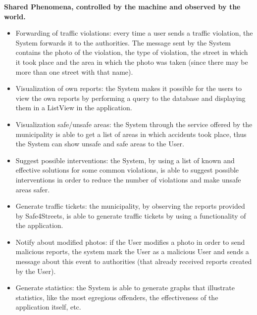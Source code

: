     \noindent\textbf{Shared Phenomena, controlled by the machine and observed by the world.}
      \begin{itemize}
          \item Forwarding of traffic violations: every time a user sends a traffic violation, the System forwards it to the authorities. The message sent by the System contains the photo of the violation, the type of violation, the street in which it took place and the area in which the photo was taken (since there may be more than one street with that name).
          \item Visualization of own reports: the System makes it possible for the users to view the own reports by performing a query to the database and displaying them in a ListView in the application.
          \item Visualization safe/unsafe areas: the System through the service offered by the municipality is able to get a list of areas in which accidents took place, thus the System can show unsafe and safe areas to the User.
          \item Suggest possible interventions: the System,  by using a list of known and effective solutions for some common violations, is able to suggest possible interventions in order to reduce the number of violations and make unsafe areas safer.
          \item Generate traffic tickets: the municipality, by observing the reports provided by Safe4Streets, is able to  generate traffic tickets by using a functionality of the application.
          \item Notify about modified photos: if the User modifies a photo in order to send malicious reports, the system mark the User as a malicious User and sends a message about this event to authorities (that already received reports created by the User). 
          \item Generate statistics: the System is able to generate graphs that illustrate statistics, like the most egregious offenders, the effectiveness of the application itself, etc.
          \end{itemize}
          

